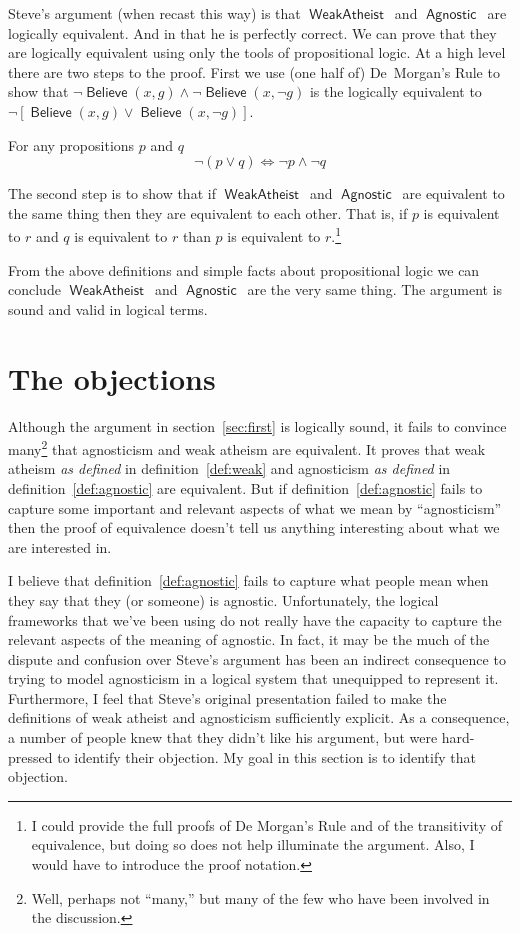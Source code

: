 \documentclass[12pt]{article}
\providecommand{\land}{\wedge}
\providecommand{\lor}{\vee}
\providecommand{\liff}{\iff}
\providecommand{\lnot}{\neg}
\newcommand{\rel}[1]{\ensuremath{\mathop{\mathsf{#1}}}}
\newcommand{\rlbelieve}{\rel{Believe}}
\newcommand{\rlwa}{\rel{WeakAtheist}}
\newcommand{\rlagno}{\rel{Agnostic}}
\begin{document}
Steve's argument (when recast this way) is that \rlwa\ and \rlagno\ are logically equivalent.
And in that he is perfectly correct. We can prove that they are logically equivalent using only the tools of propositional logic.
At a high level there are two steps to the proof. First we use (one half of) De~Morgan's Rule to show that $\lnot \rlbelieve(x, g) \land \lnot\rlbelieve(x, \lnot g)$ is the logically equivalent to $\lnot\left[\rlbelieve(x, g) \lor \rlbelieve(x, \lnot g)\right]$.

\begin{theorem}
    For any propositions $p$ and $q$ 
    \[
        \lnot\left(p \lor q\right) \liff \lnot p \land \lnot q
    \]  
\end{theorem}


The second step is to show that if \rlwa\ and \rlagno\ are equivalent to the same thing then they are equivalent to each other. That is, if $p$ is equivalent to $r$ and $q$ is equivalent to $r$ than $p$ is equivalent to $r$.\footnote{I could provide the full proofs of De Morgan's Rule and of the transitivity of equivalence, but doing so does not help illuminate the argument. Also, I would have to introduce the proof notation.}

From the above definitions and simple facts about propositional logic we can conclude \rlwa\ and \rlagno\ are the very same thing. The argument is sound and valid in logical terms.

\section{The objections}\label{sec:object}

Although the argument in section~\ref{sec:first} is logically sound, it fails to convince many\footnote{Well, perhaps not “many,” but many of the few who have been involved in the discussion.}
that agnosticism and weak atheism are equivalent.
It proves that weak atheism \emph{as defined} in definition~\ref{def:weak}
and agnosticism \emph{as defined} in definition~\ref{def:agnostic} are equivalent.
But if definition~\ref{def:agnostic} fails to capture some important and relevant aspects of what we mean by “agnosticism” then the proof of equivalence doesn't tell us anything interesting about what we are interested in.

I believe that definition~\ref{def:agnostic} fails to capture what people mean when they say that they (or someone) is agnostic.
Unfortunately, the logical frameworks that we've been using do not really have the capacity to capture the relevant aspects of the meaning of agnostic.
In fact, it may be the much of the dispute and confusion over Steve's argument has been an indirect consequence to trying to model agnosticism in a logical system that unequipped to represent it.
Furthermore, I feel that Steve's original presentation failed to make the definitions of weak atheist and agnosticism sufficiently explicit.
As a consequence, a number of people knew that they didn't like his argument, but were hard-pressed to identify their objection.
My goal in this section is to identify that objection. 
\end{document}
